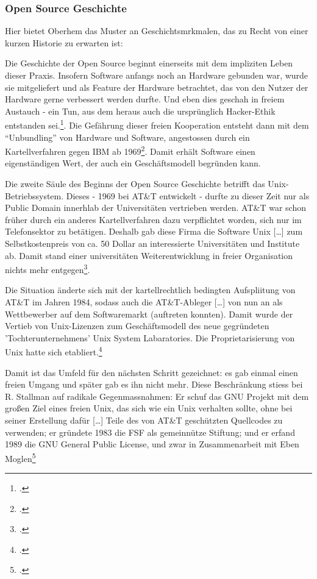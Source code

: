 \documentclass[DIV=calc,BCOR=5mm,11pt,headings=small,oneside,abstract=true, toc=bib]{scrartcl}
\begin{document}
\subsubsection{Open Source Geschichte}

Hier bietet Oberhem das Muster an Geschichtsmrkmalen, das zu Recht von einer
kurzen Historie zu erwarten ist:

Die Geschichte der Open Source beginnt einerseits mit dem impliziten Leben
dieser Praxis. Insofern Software anfangs noch an Hardware gebunden war, wurde
sie mitgeliefert und als Feature der Hardware betrachtet, das von den Nutzer der
Hardware gerne verbessert werden durfte. Und eben dies geschah in freiem
Austauch - ein Tun, aus dem heraus auch die ursprünglich
\glqq{}Hacker-Ethik\grqq{} entstanden
sei.\grqq{}\footcite[vgl.][17f]{Oberhem2008a}. Die Gefährung dieser freien
Kooperation entsteht dann mit dem ``Unbundling'' von Hardware und Software,
angestossen durch ein \glqq{}Kartellverfahren gegen IBM\grqq{} ab
1969\grqq{}\footcite[vgl.][19]{Oberhem2008a}. Damit erhält Software einen
eigenständigen Wert, der auch ein Geschäftsmodell begründen kann.

Die zweite Säule des Beginns der Open Source Geschichte betrifft das
Unix-Betriebssystem. Dieses - 1969 bei AT\&T entwickelt - durfte zu dieser Zeit
nur als Public Domain innerhlab der Universitäten vertrieben werden. AT\&T war
schon früher durch ein anderes Kartellverfahren dazu verpflichtet worden, sich
nur im Telefonsektor zu betätigen. Deshalb gab diese Firma die Software Unix
\glqq{}[\ldots] zum Selbstkostenpreis von ca. 50 Dollar an interessierte
Universitäten und Institute ab. Damit stand einer universitäten
Weiterentwicklung in freier Organisation nichts mehr
entgegen\grqq{}\grqq{}\footcite[vgl.][20]{Oberhem2008a}.

Die Situation änderte sich mit der kartellrechtlich bedingten Aufspliitung von
AT\&T im Jahren 1984, sodass auch die AT\&T-Ableger \glqq{}[\ldots] von nun an
als Wettbewerber auf dem Softwaremarkt (auftreten konnten)\grqq{}. Damit wurde
der Vertieb von Unix-Lizenzen zum Geschäftsmodell des neue gegründeten
'Tochterunternehmens' \glqq{}Unix System Labaratories\grqq{}. Die
Proprietarisierung von Unix hatte sich
etabliert.\footcite[vgl.][21]{Oberhem2008a}

Damit ist das Umfeld für den nächsten Schritt gezeichnet: es gab einmal einen
freien Umgang und später gab es ihn nicht mehr. Diese Beschränkung stiess bei R.
Stallman auf radikale Gegenmassnahmen: Er schuf das GNU Projekt mit dem großen
Ziel eines freien Unix, das sich wie ein Unix verhalten sollte, ohne bei seiner
Erstellung dafür \glqq{}[\ldots] Teile des von AT\&T geschützten
Quellcodes zu verwenden\grqq{}; er gründete 1983 die FSF als \glqq{}gemeinnütze
Stiftung\grqq{}; und er erfand 1989 die GNU General Public License, und zwar
\glqq{}in Zusammenarbeit mit Eben Moglen\grqq{}\footcite[vgl.][22]{Oberhem2008a}
\end{document}
